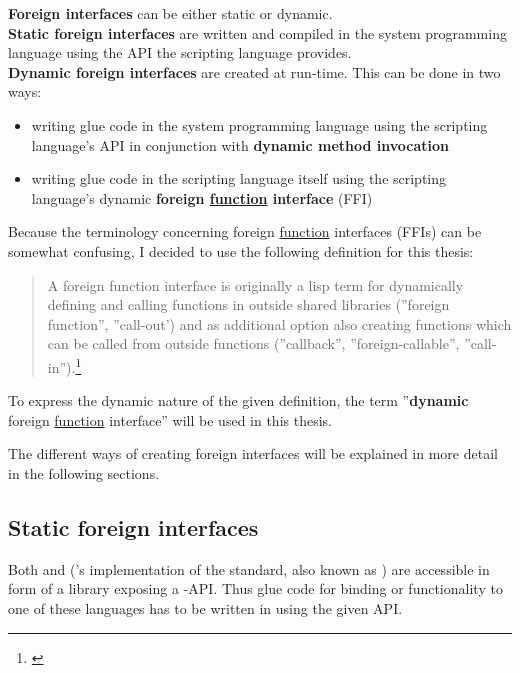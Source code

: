 \textbf{Foreign interfaces} can be either static or dynamic.\\
\textbf{Static foreign interfaces} are written and compiled in the system programming language using the API the scripting language provides.\\
\textbf{Dynamic foreign interfaces} are created at run-time. This can be done in two ways:
\begin{itemize}
\item writing glue code in the system programming language using the scripting language's API in conjunction with \textbf{dynamic method invocation}
\item writing glue code in the scripting language itself using the scripting language's dynamic \textbf{foreign \underline{function} interface} (FFI)
\end{itemize}

Because the terminology concerning foreign \underline{function} interfaces (FFIs) can be somewhat confusing, I decided to use the following definition for this thesis:

\begin{quotation}
A foreign function interface is originally a lisp term for dynamically defining and calling functions in outside shared libraries (''foreign function'', ''call-out') and as additional option also creating functions which can be called from outside functions (''callback'', ''foreign-callable'', ''call-in'').\footnote{\citep{DesignFFI}}
\end{quotation}

To express the dynamic nature of the given definition, the term ''\textbf{dynamic} foreign \underline{function} interface'' will be used in this thesis.

The different ways of creating foreign interfaces will be explained in more detail in the following sections.

\subsection{Static foreign interfaces}

Both  and  ('s implementation of the  standard, also known as ) are accessible in form of a library exposing a -API. Thus glue code for binding  or  functionality to one of these languages has to be written in  using the given API.


